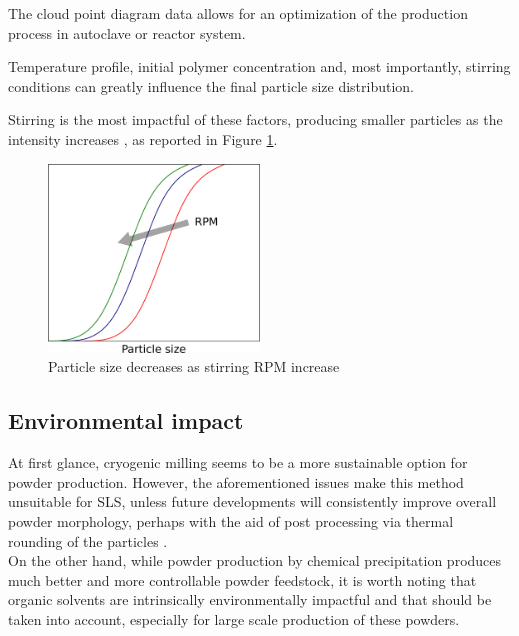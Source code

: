 \documentclass[a4paper]{article}
\begin{document}
    The cloud point diagram data allows for an optimization of the production process in autoclave or reactor system. 

    Temperature profile, initial polymer concentration and, most importantly, stirring conditions can greatly influence the final 
    particle size distribution. 
    
    Stirring is the most impactful of these factors, producing smaller particles as the intensity increases \autocites{DechetMaximilianA2020OtDo}, as reported in Figure \ref{fig:stirring_rpm}. 

    \begin{figure}[ht]
        \centering
        \includegraphics[width=0.5\textwidth]{Pictures/particle_size_stirring.eps}
        \caption{Particle size decreases as stirring RPM increase}
        \label{fig:stirring_rpm}
    \end{figure} 

    \clearpage

    \subsection{Environmental impact \label{Environmental_impact}}

    At first glance, cryogenic milling seems to be a more sustainable option for powder production. 
    However, the aforementioned issues make this method unsuitable for SLS, unless future developments will consistently improve 
    overall powder morphology, perhaps with the aid of 
    post processing via thermal rounding of the particles \autocite{DechetMaximilianA2020OtDo}. \\ 
    
    On the other hand, while powder production by 
    chemical precipitation produces much better and more 
    controllable powder feedstock, it is worth noting that organic solvents are intrinsically environmentally impactful and that should be taken 
    into account, especially for large scale production of these powders. 
\end{document}
